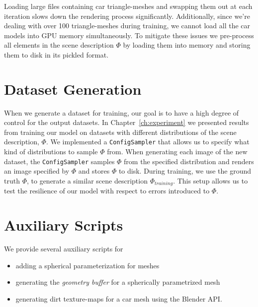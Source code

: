 Loading large files containing car triangle-meshes and swapping them out at each iteration slows down the
rendering process significantly. Additionally, since we're dealing with over 100 triangle-meshes during
training, we cannot load all the car models into GPU memory simultaneously. To mitigate these issues we
pre-process all elements in the scene description $\Phi$ by loading them into memory and storing them to
disk in its pickled format.

\section{Dataset Generation}

When we generate a dataset for training, our goal is to have a high degree of control for the output
datasets. In Chapter~\ref{ch:experiment} we presented results from training our model on datasets with
different distributions of the scene description, $\Phi$. We implemented a \texttt{ConfigSampler} that
allows us to specify what kind of distributions to sample $\Phi$ from. When generating each image of the
new dataset, the \texttt{ConfigSampler} samples $\Phi$ from the specified distribution and renders an image
specified by $\Phi$ and stores $\Phi$ to disk. During training, we use the ground truth $\Phi$, to generate
a similar scene description $\Phi_{training}$. This setup allows us to test the resilience of our model
with respect to errors introduced to $\Phi$.

\section{Auxiliary Scripts}

We provide several auxiliary scripts for
\begin{itemize}
\renewcommand\labelitemi{--}
    \item adding a spherical parameterization for meshes
    \item generating the \emph{geometry buffer} for a spherically parametrized mesh
    \item generating dirt texture-maps for a car mesh using the Blender API.
\end{itemize}